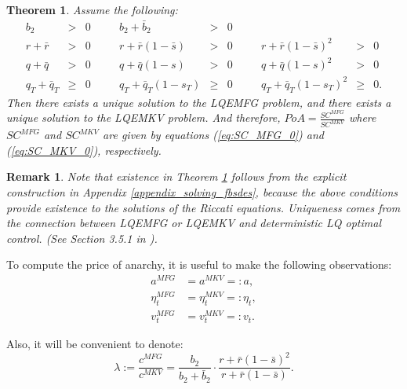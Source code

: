\documentclass[11pt]{article}
\newtheorem{remark}{Remark}
\newtheorem{theorem}{Theorem}
\begin{document}
\begin{theorem} \label{th:exist_uniq}
Assume the following:
\begin{equation}
\begin{array}{rclcrclcrcl}
    b_2 &>& 0 & & b_2 + \bar{b}_2 &>& 0 & & \\
    r+\bar{r} &>&0 &&  r+\bar{r}(1-\bar{s}) &>&0 & & r+\bar{r}(1-\bar{s})^2 &>& 0 \\
    q+\bar{q} &>& 0 && q + \bar{q}(1-s) &>& 0 & & q+ \bar{q}(1-s)^2 &>& 0 \\
    q_T + \bar{q}_T &\geq& 0 & \quad & q_T + \bar{q}_T(1-s_T) &\geq& 0 & \quad & q_T + \bar{q}_T(1-s_T)^2 &\geq& 0.
\end{array}
\label{eq:assumptions}
\end{equation}
Then there exists a unique solution to the LQEMFG problem, and there exists a unique solution to the LQEMKV problem. And therefore, $PoA=\frac{SC^{MFG}}{SC^{MKV}}$ where $SC^{MFG}$ and $SC^{MKV}$ are given by equations (\ref{eq:SC_MFG_0}) and (\ref{eq:SC_MKV_0}), respectively.
\end{theorem}

\begin{remark}
    Note that existence in Theorem \ref{th:exist_uniq} follows from the explicit construction in Appendix \ref{appendix_solving_fbsdes}, because the above conditions provide existence to the solutions of the Riccati equations. Uniqueness comes from the connection between LQEMFG or LQEMKV and deterministic LQ optimal control. (See Section 3.5.1 in \cite{Carmona_book}).
\end{remark}

To compute the price of anarchy, it is useful to make the following observations:
\begin{equation*}
\begin{split}
    a^{MFG}&=a^{MKV}=:a, \\
    \eta_t^{MFG}&=\eta_t^{MKV}=:\eta_t, \\
    v_t^{MFG}&=v_t^{MKV}=:v_t.
\end{split}
\end{equation*}

Also, it will be convenient to denote:
\begin{equation}
\lambda := \frac{c^{MFG}}{c^{MKV}} = \frac{b_2}{b_2 + \bar{b}_2}\cdot \frac{ r + \bar{r}(1-\bar{s})^2 }{r + \bar{r}(1-\bar{s})}.
\label{eq:lambda}
\end{equation}
\end{document}
